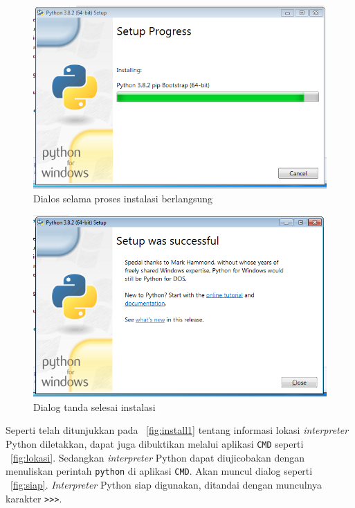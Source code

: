 \begin{figure}[h!]
  \begin{center}
    \includegraphics[scale=.5]{pics/installProgress.png}
    \caption{Dialos selama proses instalasi berlangsung}
    \label{fig:installProgres}
  \end{center}
\end{figure}

\begin{figure}[h!]
  \begin{center}
    \includegraphics[scale=.5]{pics/installFinished.png}
    \caption{Dialog tanda selesai instalasi}
    \label{fig:finish}
  \end{center}
\end{figure}

Seperti telah ditunjukkan pada \figurename~\ref{fig:install1} tentang informasi lokasi \textit{interpreter} Python diletakkan, dapat juga dibuktikan melalui aplikasi \texttt{CMD} seperti \figurename~\ref{fig:lokasi}. Sedangkan \textit{interpreter} Python dapat diujicobakan dengan menuliskan perintah \texttt{python} di aplikasi \texttt{CMD}. Akan muncul dialog seperti \figurename~\ref{fig:siap}. \textit{Interpreter} Python siap digunakan, ditandai dengan munculnya karakter \texttt{>>>}.

